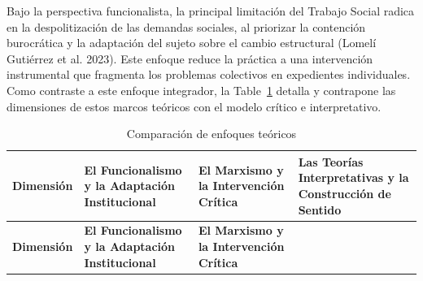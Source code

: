 \documentclass[12pt,spanish]{article}
\begin{document}
Bajo la perspectiva funcionalista, la principal limitación del Trabajo
Social radica en la despolitización de las demandas sociales, al
priorizar la contención burocrática y la adaptación del sujeto sobre el
cambio estructural (Lomelí Gutiérrez et al. 2023). Este enfoque reduce
la práctica a una intervención instrumental que fragmenta los problemas
colectivos en expedientes individuales. Como contraste a este enfoque
integrador, la Table~\ref{tbl-comparativa} detalla y contrapone las
dimensiones de estos marcos teóricos con el modelo crítico e
interpretativo.

\begingroup
\singlespacing
\fontsize{9pt}{11pt}\selectfont
\renewcommand{\arraystretch}{0.9}
\setlength{\tabcolsep}{3pt}

\begin{longtable}[]{@{}
  >{\raggedright\arraybackslash}p{}
  >{\raggedright\arraybackslash}p{}
  >{\raggedright\arraybackslash}p{}
  >{\raggedright\arraybackslash}p{}@{}}
\caption{Comparación de enfoques
teóricos}\label{tbl-comparativa}\tabularnewline
\toprule\noalign{}
\begin{minipage}[b]{\linewidth}\raggedright
\textbf{Dimensión}
\end{minipage} & \begin{minipage}[b]{\linewidth}\raggedright
\textbf{El Funcionalismo y la Adaptación Institucional}
\end{minipage} & \begin{minipage}[b]{\linewidth}\raggedright
\textbf{El Marxismo y la Intervención Crítica}
\end{minipage} & \begin{minipage}[b]{\linewidth}\raggedright
\textbf{Las Teorías Interpretativas y la Construcción de Sentido}
\end{minipage} \\
\midrule\noalign{}
\endfirsthead
\toprule\noalign{}
\begin{minipage}[b]{\linewidth}\raggedright
\textbf{Dimensión}
\end{minipage} & \begin{minipage}[b]{\linewidth}\raggedright
\textbf{El Funcionalismo y la Adaptación Institucional}
\end{minipage} & \begin{minipage}[b]{\linewidth}\raggedright
\textbf{El Marxismo y la Intervención Crítica}
\end{minipage} & \begin{minipage}[b]{\linewidth}\raggedright

\end{minipage}
\end{longtable}
\end{document}
